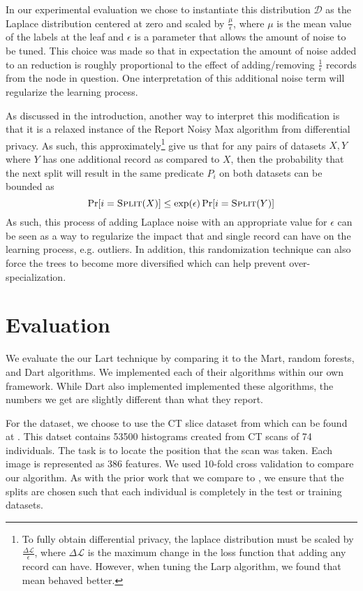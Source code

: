 \documentclass{article} %
\begin{document}
In our experimental evaluation we chose to instantiate this distribution $\mathcal{D}$ as the Laplace distribution centered at zero and scaled by $\frac{\mu}{\epsilon}$, where $\mu$ is the mean value of the labels at the leaf and $\epsilon$ is a parameter that allows the amount of noise to be tuned. This choice was made so that in expectation the amount of noise added to an reduction is roughly proportional to the effect of adding/removing $\frac{1}{\epsilon}$ records from the node in question. One interpretation of this additional noise term will regularize the learning process.

As discussed in the introduction, another way to interpret this modification is that it is a relaxed instance of the Report Noisy Max\cite{privacyBook} algorithm from differential privacy. As such, this approximately\footnote{To fully obtain differential privacy, the laplace distribution must be scaled by $\frac{ \Delta\mathcal{L}}{\epsilon}$, where $\Delta\mathcal{L}$ is the maximum change in the loss function that adding any record can have. However, when tuning the Larp algorithm, we found that mean behaved better.} give us that for any pairs of datasets $X,Y$ where $Y$ has one additional record as compared to $X$, then the probability that the next split will result in the same predicate $P_i$ on both datasets can be bounded as
$$
	\Pr[i = \textsc{Split}(X)] \leq \exp(\epsilon)\Pr[i =\textsc{Split}(Y)]
$$
As such, this process of adding Laplace noise with an appropriate value for $\epsilon$ can be seen as a way to regularize the impact that and single record can have on the learning process, e.g. outliers. In addition, this randomization technique can also force the trees to become more diversified which can help prevent over-specialization.

\section{Evaluation}

We evaluate the our Lart technique by comparing it to the Mart, random forests, and Dart\cite{dart} algorithms. We implemented each of their algorithms within our own framework. While Dart\cite{dart} also implemented implemented these algorithms, the numbers we get are slightly different than what they report. 

For the dataset, we choose to use the CT slice dataset from \cite{graf20112d} which can be found at \cite{uci_ctSlice}. This datset contains 53500 histograms created from CT scans of 74 individuals. The task is to locate the position that the scan was taken. Each image is represented as 386 features. We used 10-fold cross validation to compare our algorithm. As with the prior work that we compare to \cite{dart}, we ensure that the splits are chosen such that each individual is completely in the test or training datasets.
\end{document}
